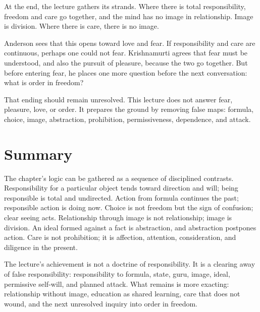 At the end, the lecture gathers its strands. Where there is total responsibility, freedom and care go together, and the mind has no image in relationship. Image is division. Where there is care, there is no image.

Anderson sees that this opens toward love and fear. If responsibility and care are continuous, perhaps one could not fear. Krishnamurti agrees that fear must be understood, and also the pursuit of pleasure, because the two go together. But before entering fear, he places one more question before the next conversation: what is order in freedom?

That ending should remain unresolved. This lecture does not answer fear, pleasure, love, or order. It prepares the ground by removing false maps: formula, choice, image, abstraction, prohibition, permissiveness, dependence, and attack.

\section{Summary}

The chapter's logic can be gathered as a sequence of disciplined contrasts. Responsibility for a particular object tends toward direction and will; being responsible is total and undirected. Action from formula continues the past; responsible action is doing now. Choice is not freedom but the sign of confusion; clear seeing acts. Relationship through image is not relationship; image is division. An ideal formed against a fact is abstraction, and abstraction postpones action. Care is not prohibition; it is affection, attention, consideration, and diligence in the present.

The lecture's achievement is not a doctrine of responsibility. It is a clearing away of false responsibility: responsibility to formula, state, guru, image, ideal, permissive self-will, and planned attack. What remains is more exacting: relationship without image, education as shared learning, care that does not wound, and the next unresolved inquiry into order in freedom.